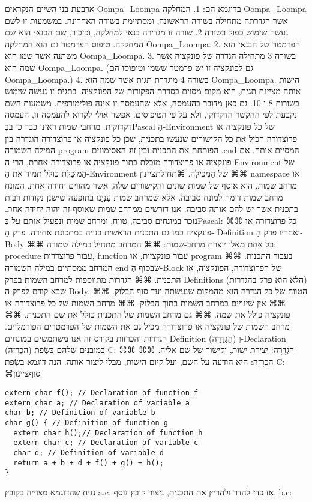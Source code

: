       ארבעת בני השיום הנקראים Oompa\_Loompa בדוגמא הם:
      1. המחלקה Oompa\_Loompa אשר הגדרתה מתחילה בשורה הראשונה, ומסתיימת בשורה האחרונה. במשמעות זו לשם נעשה שימוש כפול בשורה 2. שורה זו מגדירה בנאי למחלקה, וכזכור, שם הבנאי הוא שם המחלקה. טיפוס הפרמטר גם הוא המחלקה Oompa\_Loompa.
      2. הפרמטר של הבנאי הוא משתנה אשר שמו הוא Oompa\_Loompa.
      3. בשורה 3 מתחילה הגדרה של פונקציה אשר שמה הוא Oompa\_Loompa. (גם לפונקציה זו יש פרמטר ששמו וטיפוסו הם Oompa\_Loompa.)
      4. בשורה 4 מוגדרת תגית אשר שמה הוא Oompa\_Loompa. הישות אותה מציינת תגית, הוא מקום מסוים בסדרת הפקודות של הפונקציה. בתגית זו נעשה שימוש בשורות 8 ו-10.
      גם כאן מדובר בהעמסה, אלא שהעמסה זו אינה פולימורפית. משמעות השם נקבעת לפי ההקשר הדקדוקי, ולא על פי הטיפוסים. אפשר אולי לקרוא להעמסה זו, העמסה דקדוקית.
      מרחבי שמות
      ראינו כבר כי בבְּPascal הַ-Environment של כל פונקציה או פרוצדורה הכיל את כל הקישורים שנעשו בתכנית, שכן כל פונקציה או פרוצדורה הוגדרה בין המילה השמורה program הפותחת את התכנית ובין זוג האסימונים .end המסיים אותה. אם פונקציה או פרוצדורה מוכלת בתוך פונקציה או פרוצדורה אחרת, הרי הַ-Environment של הַמּוּכֶלֶת כולל תמיד את הַ-Environment של הַמְּכִילָה.
      ⌘תחילת{ציינון}
      ⌘⌘ namespace או מרחב שמות, הוא אוסף של שמות
      שונים והקישורים שלה, אשר מהווים יחידה אחת.
      המונח מרחב שמות דומה למונח סביבה. אלא שמרחב
      שמות עִנְיָנוֹ בתופעה שישנן נקודות רבות בתכנית אשר
      יש להם אותה סביבה. אנו דורשים ממרחב שמות שאוסף
      זה יהוה יחידה אחת.
      נזכר במונחים סביבה, טווח, ומרחב-שמות ונפעיל אותם על בְּPascal:
      ⌘⌘ כל פרוצדורה או פונקציה כמו גם התכנית הראשית בנויה במתכונת אחידה. פרק הַ- Definition ואחריו פרק הַ-Body
      ⌘⌘ כל אחת מאלו יוצרת מרחב-שמות:
      ⌘⌘ המרחב מתחיל במילה שמורה: procedure עבור פרוצדרות, function עבור פונקציות, או program בעבור התכנית.
      ⌘⌘ המרחב ממסתיים במילה השמורה end שבסוף הַ-Block של הפרוצדורה, הפונקציה, או התכנית.
      ⌘⌘ הגדרות מתווספות למרחב השמות בפרק Definitions (הלא הוא פרק בהגדרות) שבא קודם לפרק הַ-Body.
      ⌘⌘ הטווח של כל הגדרה הוא מהמקום שנעשתה ועד סוף הבלוק.
      ⌘⌘ אין שינויים במרחב השמות בתוך הבלוק.
      ⌘⌘ מרחב השמות של כל פרוצדורה או פונקציה כולל את שמה.
      ⌘⌘ גם מרחב השמות של התכנית כולל את שם התכנית.
      ⌘⌘ מרחב השמות של פונקציה או פרוצדורה מכיל גם את השמות של הפרמטרים הפורמליים.
      הגדרות והכרזות
      בקורס זה אנו משתמשים במונחים Definition (הַגְדָּרָה) וְ-Declaration (הַכְרָזָה) במובנים שלהם בִּשְׂפַת C:
      ⌘⌘ הַגְדָּרָה: יצירת ישות, וקישור של שם אליה.
      ⌘⌘ הַכְרָזָה: היא הודעה על השם, ועל קיום הישות, מבלי ליצור אותה.
      הנה דוגמא בִּשְׂפַת C:
  ⌘סוף{ציינון}
\begin{verbatim}
extern char f(); // Declaration of function f
extern char a; // Declaration of variable a
char b; // Definition of variable b
char g() { // Definition of function g
  extern char h();// Declaration of function h
  extern char c; // Declaration of variable c
  char d; // Definition of variable d
  return a + b + d + f() + g() + h();
}
\end{verbatim}
      נניח שהדוגמא מצוייה בקובץ a.c. אז כדי להדר ולהריץ את התכנית, ניצור קובץ נוסף, b.c:

